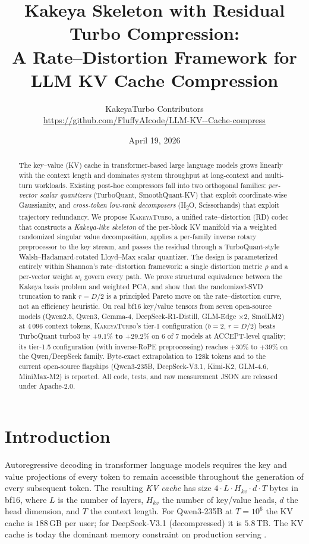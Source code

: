 \documentclass[11pt,a4paper]{article}
\title{\textbf{Kakeya Skeleton with Residual Turbo Compression:}\\
  \textbf{A Rate--Distortion Framework for LLM KV Cache Compression}}
\author{KakeyaTurbo Contributors\\
 \small \url{https://github.com/FluffyAIcode/LLM-KV--Cache-compress}}
\date{April 19, 2026}
\theoremstyle{definition}
\theoremstyle{plain}
\begin{document}
\maketitle

\begin{abstract}
The key--value (KV) cache in transformer-based large language models grows linearly with the context length and dominates system throughput at long-context and multi-turn workloads. Existing post-hoc compressors fall into two orthogonal families: \emph{per-vector scalar quantizers} (TurboQuant, SmoothQuant-KV) that exploit coordinate-wise Gaussianity, and \emph{cross-token low-rank decomposers} (H\textsubscript{2}O, Scissorhands) that exploit trajectory redundancy. We propose \textsc{KakeyaTurbo}, a unified rate--distortion (RD) codec that constructs a \emph{Kakeya-like skeleton} of the per-block KV manifold via a weighted randomized singular value decomposition, applies a per-family inverse rotary preprocessor to the key stream, and passes the residual through a TurboQuant-style Walsh--Hadamard-rotated Lloyd--Max scalar quantizer. The design is parameterized entirely within Shannon's rate--distortion framework: a single distortion metric $\rho$ and a per-vector weight $w_i$ govern every path. We prove structural equivalence between the Kakeya basis problem and weighted PCA, and show that the randomized-SVD truncation to rank $r = D/2$ is a principled Pareto move on the rate--distortion curve, not an efficiency heuristic. On real bf16 key/value tensors from seven open-source models (Qwen2.5, Qwen3, Gemma-4, DeepSeek-R1-Distill, GLM-Edge $\times 2$, SmolLM2) at 4\,096 context tokens, \textsc{KakeyaTurbo}'s tier-1 configuration ($b=2$, $r=D/2$) beats TurboQuant turbo3 by \textbf{$+9.1\%$ to $+29.2\%$} on 6 of 7 models at ACCEPT-level quality; its tier-1.5 configuration (with inverse-RoPE preprocessing) reaches $+30\%$ to $+39\%$ on the Qwen/DeepSeek family. Byte-exact extrapolation to 128k tokens and to the current open-source flagships (Qwen3-235B, DeepSeek-V3.1, Kimi-K2, GLM-4.6, MiniMax-M2) is reported. All code, tests, and raw measurement JSON are released under Apache-2.0.
\end{abstract}

\section{Introduction}
\label{sec:intro}

Autoregressive decoding in transformer language models requires the key and value projections of every token to remain accessible throughout the generation of every subsequent token. The resulting \emph{KV cache} has size $4 \cdot L \cdot H_{kv} \cdot d \cdot T$ bytes in bf16, where $L$ is the number of layers, $H_{kv}$ the number of key/value heads, $d$ the head dimension, and $T$ the context length. For Qwen3-235B at $T = 10^6$ the KV cache is $188$\,GB per user; for DeepSeek-V3.1 (decompressed) it is $5.8$\,TB. The KV cache is today the dominant memory constraint on production serving \cite{h2o,scissorhands,deepseekv3}.
\end{document}
